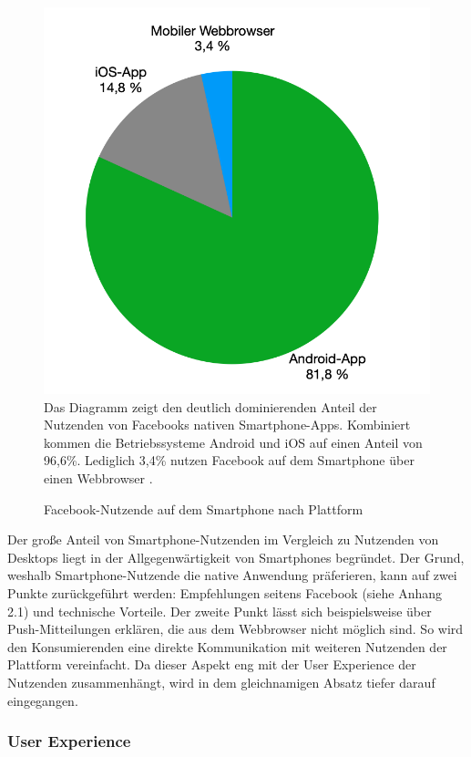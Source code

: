 \documentclass[a4paper]{scrartcl}
\begin{document}
\begin{figure}[H]
	\centering
	\caption{Facebook-Nutzende auf dem Smartphone nach Plattform}
	\includegraphics[scale=0.3]{_assets/facebook_mobile_users.png} \\
	\justifying
	\small	
	Das Diagramm zeigt den deutlich dominierenden Anteil der Nutzenden von Facebooks nativen Smartphone-Apps. Kombiniert kommen die Betriebssysteme Android und iOS auf einen Anteil von 96,6\%. Lediglich 3,4\% nutzen Facebook auf dem Smartphone über einen Webbrowser \autocite{Kemp_Facebook}.
\end{figure}

Der große Anteil von Smartphone-Nutzenden im Vergleich zu Nutzenden von Desktops liegt in der Allgegenwärtigkeit von Smartphones begründet. Der Grund, weshalb Smartphone-Nutzende die native Anwendung präferieren, kann auf zwei Punkte zurückgeführt werden: Empfehlungen seitens Facebook (siehe Anhang 2.1) und technische Vorteile. Der zweite Punkt lässt sich beispielsweise über Push-Mitteilungen erklären, die aus dem Webbrowser nicht möglich sind. So wird den Konsumierenden eine direkte Kommunikation mit weiteren Nutzenden der Plattform vereinfacht. Da dieser Aspekt eng mit der User Experience der Nutzenden zusammenhängt, wird in dem gleichnamigen Absatz tiefer darauf eingegangen.

\subsubsection{User Experience}
\end{document}
